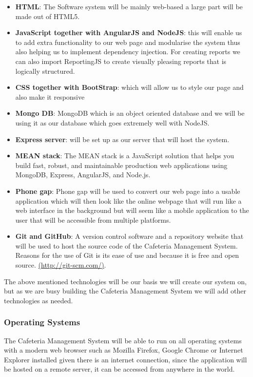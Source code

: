 \documentclass[a4paper,12pt]{article}
\begin{document}
\begin{itemize}
 \item \textbf{HTML}: The Software system will be mainly web-based a large part will be made out of HTML5.
 \item \textbf{JavaScript together with AngularJS  and NodeJS}: this will enable us to add extra functionality to our web page and modularise the system thus also helping us to implement dependency injection. For creating reports we can also import ReportingJS to create visually pleasing reports that is logically structured.

 \item \textbf{CSS together with BootStrap}: which will allow us to style our page and also make it responsive

 \item \textbf{Mongo DB}: MongoDB which is an object oriented database and we will be using it as our database which goes 	
extremely well with NodeJS. 

 \item \textbf{Express server}: will be set up as our server that will host the system.

\item \textbf{MEAN stack}: The MEAN stack is a JavaScript solution that helps you  build fast, robust, and maintainable 	 production web applications using  MongoDB, Express, AngularJS, and 	 Node.js.


 \item \textbf{Phone gap}: Phone gap will be used to convert our web page into a usable application which will then look like the online webpage that will run like a web interface in the background but  will seem like a mobile application to the user that will be accessible from multiple platforms.

\item \textbf{Git and GitHub}: A version control software and a repository website that will be used to host the source code of the Cafeteria Management System. Reasons for the use of Git is its ease of use and because it is free and open source.
 \url{(http://git-scm.com/)}.

\end{itemize}
The above mentioned technologies will be our basis we will create our system on, but as we are busy building the Cafeteria Management System we will add other technologies as needed. 

\subsubsection{Operating Systems}
The Cafeteria Management System will be able to run on all operating systems with a modern web browser such as Mozilla Firefox, Google Chrome or Internet Explorer installed given there is an internet connection, since the application will be hosted on a remote server, it can be accessed from anywhere in the world.
\end{document}
